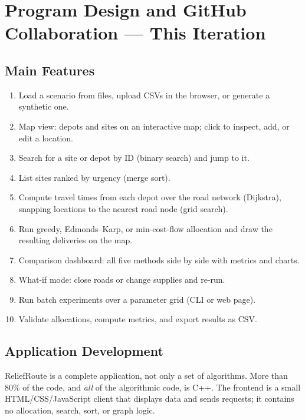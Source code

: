 \documentclass[11pt]{article}
\begin{document}
\section{Program Design and GitHub Collaboration --- This Iteration}

\subsection{Main Features}
\begin{enumerate}
  \item Load a scenario from files, upload CSVs in the browser, or generate
        a synthetic one.
  \item Map view: depots and sites on an interactive map; click to inspect,
        add, or edit a location.
  \item Search for a site or depot by ID (binary search) and jump to it.
  \item List sites ranked by urgency (merge sort).
  \item Compute travel times from each depot over the road network
        (Dijkstra), snapping locations to the nearest road node (grid
        search).
  \item Run greedy, Edmonds--Karp, or min-cost-flow allocation and draw the
        resulting deliveries on the map.
  \item Comparison dashboard: all five methods side by side with
        metrics and charts.
  \item What-if mode: close roads or change supplies and re-run.
  \item Run batch experiments over a parameter grid (CLI or web page).
  \item Validate allocations, compute metrics, and export results as CSV.
\end{enumerate}

\subsection{Application Development}
ReliefRoute is a complete application, not only a set of algorithms. More
than 80\% of the code, and \emph{all} of the algorithmic code, is C++. The
frontend is a small HTML/CSS/JavaScript client that displays data and sends
requests; it contains no allocation, search, sort, or graph logic.
\end{document}

